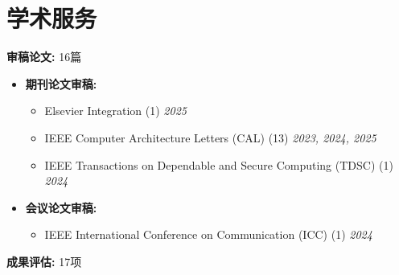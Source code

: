 \documentclass{resume}
\begin{document}
\section{学术服务}
\textbf{审稿论文:} {\large 16}篇
\begin{itemize}[itemsep=1pt, topsep=2pt, leftmargin=*]
    \item \textbf{期刊论文审稿:}
        \begin{itemize}[label={}, leftmargin=1em, itemsep=0pt]
            \item Elsevier Integration (1) \hfill \textit{2025}
            \item IEEE Computer Architecture Letters (CAL) (13) \hfill \textit{2023, 2024, 2025}
            \item IEEE Transactions on Dependable and Secure Computing (TDSC) (1) \hfill \textit{2024}
        \end{itemize}
    \item \textbf{会议论文审稿:}
        \begin{itemize}[label={}, leftmargin=1em, itemsep=0pt]
            \item IEEE International Conference on Communication (ICC) (1) \hfill \textit{2024}
        \end{itemize}
\end{itemize}
\vspace{5pt}
\textbf{成果评估:} {\large 17}项
\end{document}
